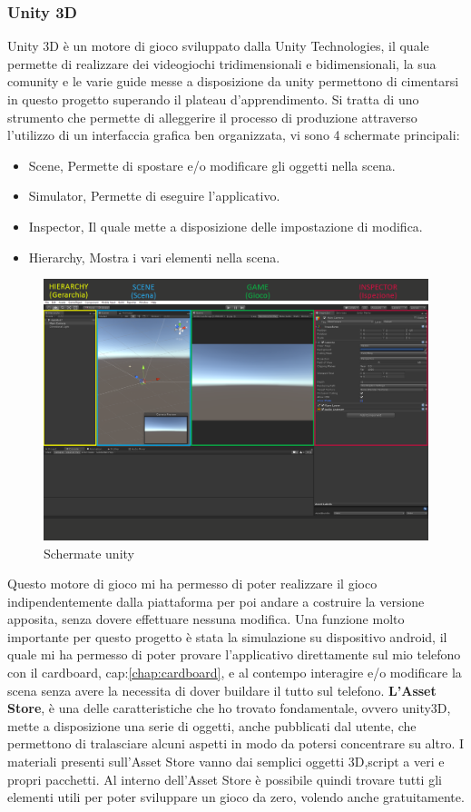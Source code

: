 \documentclass[
a4paper,
cleardoublepage=empty,
headings=twolinechapter,
numbers=autoenddot,
]{scrbook}
\begin{document}
    \subsubsection{Unity 3D}\label{unity3D}
    Unity 3D è un motore di gioco sviluppato dalla Unity
    Technologies, il quale permette di realizzare dei videogiochi tridimensionali e bidimensionali, la sua comunity e le varie guide messe a disposizione da unity permettono di cimentarsi in questo progetto superando il plateau d'apprendimento.
    Si tratta di uno strumento che permette di alleggerire il processo di produzione attraverso l'utilizzo di un interfaccia grafica ben organizzata, vi sono 4 schermate principali:
    \begin{itemize}
    	\item Scene, Permette di spostare e/o modificare gli oggetti nella scena.
    	\item Simulator, Permette di eseguire l'applicativo.
    	\item Inspector, Il quale mette a disposizione delle impostazione di modifica.
    	\item Hierarchy, Mostra i vari elementi nella scena.
    \end{itemize}
    \begin{figure}[H]
    	\centering
    	\includegraphics[width=0.8\linewidth]{image/unity}
    	\caption{Schermate unity}
    	\label{fig:unity}
    \end{figure}
    Questo motore di gioco mi ha permesso  di poter realizzare il gioco indipendentemente dalla piattaforma per poi andare a costruire la versione apposita, senza dovere effettuare nessuna modifica.
    Una funzione molto importante per questo progetto è stata la simulazione su dispositivo android, il quale mi ha permesso di poter provare l'applicativo direttamente sul mio telefono con il cardboard, cap:\ref{chap:cardboard}, e al contempo interagire e/o modificare la scena senza avere la necessita di dover buildare il tutto sul telefono.
    \textbf{L'Asset Store}, è una delle caratteristiche che ho trovato fondamentale, ovvero unity3D, mette a disposizione una serie di oggetti, anche pubblicati dal utente, che permettono di tralasciare alcuni aspetti in modo da potersi concentrare su altro.
    I materiali presenti sull'Asset Store vanno dai semplici oggetti 3D,script a veri e propri pacchetti.
    Al interno dell'Asset Store è possibile quindi trovare tutti gli elementi utili per poter sviluppare un gioco da zero, volendo anche gratuitamente.
\end{document}
